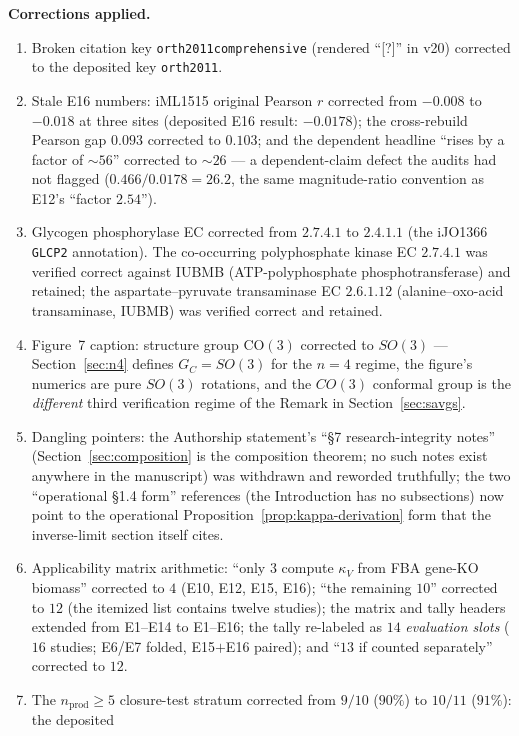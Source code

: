 \documentclass[11pt,a4paper]{article}
\theoremstyle{plain}
\theoremstyle{definition}
\theoremstyle{remark}
\newcommand{\CO}{\mathrm{CO}}
\begin{document}
\textbf{Corrections applied.}
\begin{enumerate}\itemsep0pt
\item Broken citation key \texttt{orth2011comprehensive} (rendered
``{[?]}'' in v20) corrected to the deposited key \texttt{orth2011}.
\item Stale E16 numbers: iML1515 original Pearson $r$ corrected from
$-0.008$ to $-0.018$ at three sites (deposited E16 result:
$-0.0178$); the cross-rebuild Pearson gap $0.093$ corrected to
$0.103$; and the dependent headline ``rises by a factor of
$\sim 56$'' corrected to $\sim 26$ --- a dependent-claim defect the
audits had not flagged ($0.466/0.0178 = 26.2$, the same
magnitude-ratio convention as E12's ``factor $2.54$'').
\item Glycogen phosphorylase EC corrected from $2.7.4.1$ to
$2.4.1.1$ (the iJO1366 \texttt{GLCP2} annotation). The co-occurring
polyphosphate kinase EC $2.7.4.1$ was verified correct against IUBMB
(ATP-polyphosphate phosphotransferase) and retained; the
aspartate--pyruvate transaminase EC $2.6.1.12$ (alanine--oxo-acid
transaminase, IUBMB) was verified correct and retained.
\item Figure~7 caption: structure group $\CO(3)$ corrected to
$SO(3)$ --- Section~\ref{sec:n4} defines $G_C = SO(3)$ for the $n=4$
regime, the figure's numerics are pure $SO(3)$ rotations, and the
$CO(3)$ conformal group is the \emph{different} third verification
regime of the Remark in Section~\ref{sec:savgs}.
\item Dangling pointers: the Authorship statement's ``\S 7
research-integrity notes'' (Section~\ref{sec:composition} is the
composition theorem; no such notes exist anywhere in the manuscript)
was withdrawn and reworded truthfully; the two ``operational \S1.4
form'' references (the Introduction has no subsections) now point to
the operational Proposition~\ref{prop:kappa-derivation} form that the
inverse-limit section itself cites.
\item Applicability matrix arithmetic: ``only $3$ compute $\kappa_V$
from FBA gene-KO biomass'' corrected to $4$ (E10, E12, E15, E16);
``the remaining $10$'' corrected to $12$ (the itemized list contains
twelve studies); the matrix and tally headers extended from E1--E14
to E1--E16; the tally re-labeled as $14$ \emph{evaluation slots}
($16$ studies; E6/E7 folded, E15$+$E16 paired); and ``$13$ if
counted separately'' corrected to $12$.
\item The $n_{\mathrm{prod}} \geq 5$ closure-test stratum corrected
from $9/10$ ($90\%$) to $10/11$ ($91\%$): the deposited

\end{enumerate}
\end{document}
